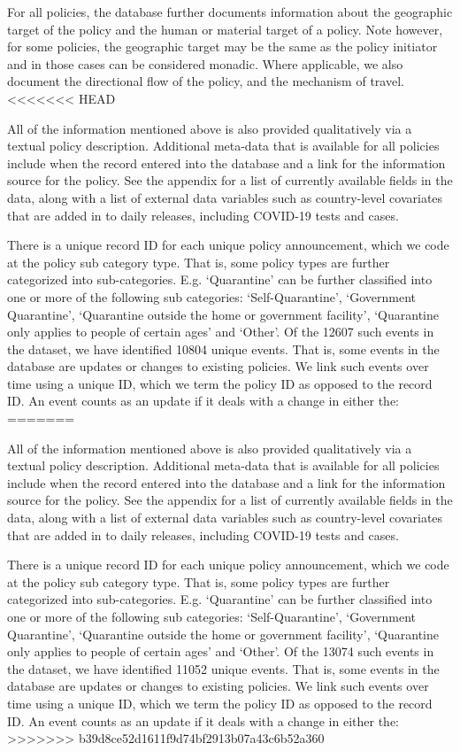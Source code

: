 \documentclass[]{article}
\begin{document}
For all policies, the database further documents information about the geographic target of the policy and the human or material target of a policy. Note however, for some policies, the geographic target may be the same as the policy initiator and in those cases can be considered monadic. Where applicable, we also document the directional flow of the policy, and the mechanism of travel.
<<<<<<< HEAD

All of the information mentioned above is also provided qualitatively via a textual policy description. Additional meta-data that is available for all policies include when the record entered into the database and a link for the information source for the policy. See the appendix for a list of currently available fields in the data, along with a list of external data variables such as country-level covariates that are added in to daily releases, including COVID-19 tests and cases.

There is a unique record ID for each unique policy announcement, which we code at the policy sub category type. That is, some policy types are further categorized into sub-categories. E.g. `Quarantine' can be further classified into one or more of the following sub categories: `Self-Quarantine', `Government Quarantine', `Quarantine outside the home or government facility', `Quarantine only applies to people of certain ages' and `Other'. Of the 12607 such events in the dataset, we have identified 10804 unique events. That is, some events in the database are updates or changes to existing policies. We link such events over time using a unique ID, which we term the policy ID as opposed to the record ID. An event counts as an update if it deals with a change in either the:
=======

All of the information mentioned above is also provided qualitatively via a textual policy description. Additional meta-data that is available for all policies include when the record entered into the database and a link for the information source for the policy. See the appendix for a list of currently available fields in the data, along with a list of external data variables such as country-level covariates that are added in to daily releases, including COVID-19 tests and cases.

There is a unique record ID for each unique policy announcement, which we code at the policy sub category type. That is, some policy types are further categorized into sub-categories. E.g. `Quarantine' can be further classified into one or more of the following sub categories: `Self-Quarantine', `Government Quarantine', `Quarantine outside the home or government facility', `Quarantine only applies to people of certain ages' and `Other'. Of the 13074 such events in the dataset, we have identified 11052 unique events. That is, some events in the database are updates or changes to existing policies. We link such events over time using a unique ID, which we term the policy ID as opposed to the record ID. An event counts as an update if it deals with a change in either the:
>>>>>>> b39d8ce52d1611f9d74bf2913b07a43c6b52a360
\end{document}
